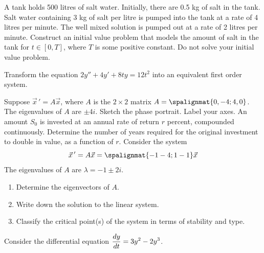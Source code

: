 \documentclass[12pt]{exam}
\begin{document}
\begin{questions}
\begin{parts}
    \end{parts}
 	
    \question[4] A tank holds 500 litres of salt water. Initially, there are 0.5 kg of salt in the tank. Salt water containing 3 kg of salt per litre is pumped into the tank at a rate of 4 litres per minute. The well mixed solution is pumped out at a rate of 2 litres per minute. Construct an initial value problem that models the amount of salt in the tank for $t\in[0,T]$, where $T$ is some positive constant. Do not solve your initial value problem. 

    \question[3] Transform the equation $\displaystyle 2y'' + 4 y' + 8ty = 12t^2$ into an equivalent first order system. 

    \question[3] %
    Suppose $\vec x \, ' = A \vec x$, where $A$ is the $2\times 2$ matrix
    $A = \spalignmat{0,-4;4,0}$.
    The eigenvalues of $A$ are $\pm 4i$. Sketch the phase portrait. Label your axes.
    \question[4] An amount $S_0$ is invested at an annual rate of return $r$ percent, compounded continuously. Determine the number of years required for the original investment to double in value, as a function of $r$. 
    \question[6] Consider the system $$ \vec x \, ' = A \vec x = \spalignmat{-1 -4;1 -1} \vec x$$ The eigenvalues of $A$ are $\lambda = -1 \pm 2i$. 
    \begin{enumerate}
        \item Determine the eigenvectors of $A$. 
        \item Write down the solution to the linear system. 
        \item Classify the critical point(s) of the system in terms of stability and type.
    \end{enumerate}
    \question[10] Consider the differential equation $\displaystyle {\frac{dy}{dt}} = 3y^2 - 2y^3$.
    

\end{questions}
\end{document}
